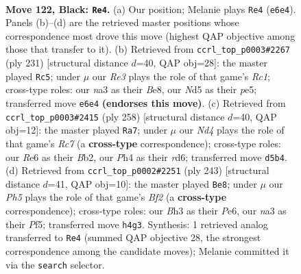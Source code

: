 \documentclass[11pt]{article}
\begin{document}
\begin{figure}[p]\centering
\begin{subfigure}{0.46\textwidth}\centering
\resizebox{\linewidth}{!}{%
\newchessgame
\chessboard[
  setfen={6K1/1k6/p3r3/P2n1p2/5B1p/N5Pb/8/R7 b - - 5 122},
  showmover=false,
  pgfstyle=straightmove, color=movearrow, markmove={e6-e4}
]}
\caption{}
\end{subfigure}\hfill
\begin{subfigure}{0.46\textwidth}\centering
\resizebox{\linewidth}{!}{%
\newchessgame
\chessboard[
  setfen={2r1bk2/5p1K/4pP2/4P1p1/3R1P2/3B4/8/8 b - - 0 116},
  showmover=false,
  pgfstyle=straightmove, color=movearrow, markmove={c8-c5}
]}
\caption{}
\end{subfigure}
\\[4pt]
\begin{subfigure}{0.46\textwidth}\centering
\resizebox{\linewidth}{!}{%
\newchessgame
\chessboard[
  setfen={4k3/2Rb4/3r1pp1/8/4PK1P/5P2/1B6/8 w - - 5 130},
  showmover=false,
  pgfstyle=straightmove, color=movearrow, markmove={c7-a7}
]}
\caption{}
\end{subfigure}\hfill
\begin{subfigure}{0.46\textwidth}\centering
\resizebox{\linewidth}{!}{%
\newchessgame
\chessboard[
  setfen={2R5/4kbp1/4p2p/4Pp1P/3r4/8/4BPK1/8 b - - 4 122},
  showmover=false,
  pgfstyle=straightmove, color=movearrow, markmove={f7-e8}
]}
\caption{}
\end{subfigure}
\caption{\textbf{Move 122, Black: \texttt{Re4}.} (a) Our position; Melanie plays \texttt{Re4} (\texttt{e6e4}). Panels (b)--(d) are the retrieved master positions whose correspondence most drove this move (highest QAP objective among those that transfer to it). (b) Retrieved from \texttt{ccrl\_top\_p0003\#2267} (ply 231) [structural distance $d$=40, QAP obj=28]: the master played \texttt{Rc5}; under $\mu$ our \emph{Re3} plays the role of that game's \emph{Rc1}; cross-type roles: our \emph{n}a3 as their \emph{B}e8, our \emph{N}d5 as their \emph{p}e5; transferred move \texttt{e6e4} \textbf{(endorses this move)}. (c) Retrieved from \texttt{ccrl\_top\_p0003\#2415} (ply 258) [structural distance $d$=40, QAP obj=12]: the master played \texttt{Ra7}; under $\mu$ our \emph{Nd4} plays the role of that game's \emph{Rc7} (a \textbf{cross-type} correspondence); cross-type roles: our \emph{R}e6 as their \emph{B}b2, our \emph{P}h4 as their \emph{r}d6; transferred move \texttt{d5b4}. (d) Retrieved from \texttt{ccrl\_top\_p0002\#2251} (ply 243) [structural distance $d$=41, QAP obj=10]: the master played \texttt{Be8}; under $\mu$ our \emph{Ph5} plays the role of that game's \emph{Bf2} (a \textbf{cross-type} correspondence); cross-type roles: our \emph{B}h3 as their \emph{P}e6, our \emph{n}a3 as their \emph{P}f5; transferred move \texttt{h4g3}. Synthesis: 1 retrieved analog transferred to \texttt{Re4} (summed QAP objective 28, the strongest correspondence among the candidate moves); Melanie committed it via the \texttt{search} selector.}
\label{fig:thought-m243}
\end{figure}
\end{document}

